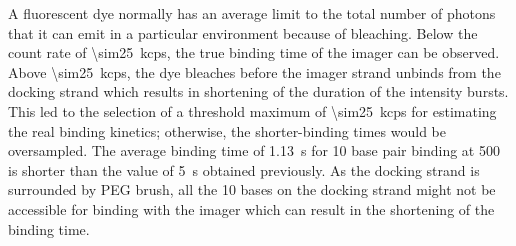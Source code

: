 A fluorescent dye normally has an average limit to the total number of photons that it can emit in a particular environment because of bleaching.
Below the count rate of \SI{\sim25}{kcps}, the true binding time of the imager can be observed.
Above \SI{\sim25}{kcps}, the dye bleaches before the imager strand unbinds from the docking strand which results in shortening of the duration of the intensity bursts.
This led to the selection of a threshold maximum of \SI{\sim25}{kcps} for estimating the real binding kinetics; otherwise, the shorter-binding times would be oversampled.
The average binding time of \SI{1.13}{\s} for 10 base pair binding at \SI{500}{\mM}  is shorter than the value of \SI{5}{\s} obtained previously.\cite{jungmann2010singlemolecule}
As the docking strand is surrounded by PEG brush, all the 10 bases on the docking strand might not be accessible for binding with the imager which can result in the shortening of the binding time. 

